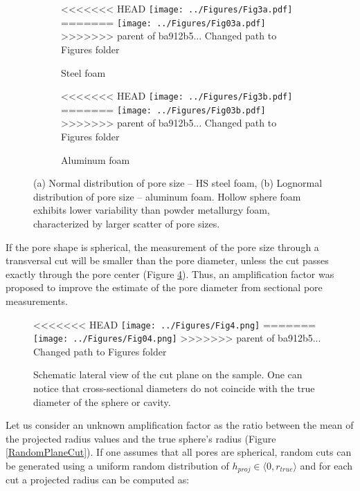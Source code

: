 \documentclass[review]{elsarticle}
\begin{document}
\begin{figure}
	\centering
	\begin{subfigure}{.5\textwidth}
		\centering
<<<<<<< HEAD
		\texttt{[image: ../Figures/Fig3a.pdf]}
=======
		\texttt{[image: ../Figures/Fig03a.pdf]}
>>>>>>> parent of ba912b5... Changed path to Figures folder
		\caption{Steel foam}
		\label{fig3:sub1}
	\end{subfigure}%
	\begin{subfigure}{.5\textwidth}
		\centering
<<<<<<< HEAD
		\texttt{[image: ../Figures/Fig3b.pdf]}
=======
		\texttt{[image: ../Figures/Fig03b.pdf]}
>>>>>>> parent of ba912b5... Changed path to Figures folder
		\caption{Aluminum foam}
		\label{fig3:sub2}
	\end{subfigure}
	\caption{(a) Normal distribution of pore size – HS steel foam, (b) Lognormal distribution of pore size – aluminum foam. Hollow sphere foam exhibits lower variability than powder metallurgy foam, characterized by larger scatter of pore sizes.}
	\label{PoreSizeHistograms}
\end{figure}

If the pore shape is spherical, the measurement of the pore size through a transversal cut will be smaller than the pore diameter, unless the cut passes exactly through the pore center (Figure \ref{FoamCutPlane}). Thus, an amplification factor was proposed to improve the estimate of the pore diameter from sectional pore measurements.

\begin{figure}[htbp]
	\begin{center}
<<<<<<< HEAD
		\texttt{[image: ../Figures/Fig4.png]}
=======
		\texttt{[image: ../Figures/Fig04.png]}
>>>>>>> parent of ba912b5... Changed path to Figures folder
		\caption{Schematic lateral view of the cut plane on the sample. One can notice that cross-sectional diameters do not coincide with the true diameter of the sphere or cavity.}
		\label{FoamCutPlane}
	\end{center}
\end{figure}


Let us consider an unknown amplification factor as the ratio between the mean of the projected radius values and the true sphere’s radius (Figure \ref{RandomPlaneCut}). If one assumes that all pores are spherical, random cuts can be generated using a uniform random distribution of $h_{proj} \in \langle 0,r_{true} \rangle$ and for each cut a projected radius can be computed as:
\end{document}
